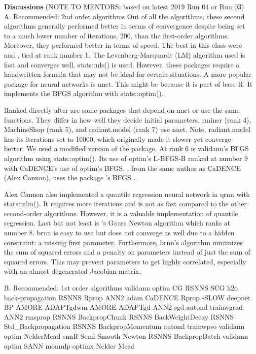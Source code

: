 \textbf{Discussions} (NOTE TO MENTORS: based on latest 2019 Run 04 or
Run 03) A. Recommended: 2nd order algorithms Out of all the algorithms,
these second algorithms generally performed better in terms of
convergence despite being set to a much lower number of iterations, 200,
than the first-order algorithms. Moreover, they performed better in
terms of speed. The best in this class were  and
, tied at rank number 1. The Levenberg-Marquardt (LM)
algorithm used is fast and converges well. stats::nls() is used.
However, these packages require a handwritten formula that may not be
ideal for certain situations. A more popular package for neural networks
is nnet. This might be because it is part of base R. It implements the
BFGS algorithm with stats::optim().

Ranked directly after are some packages that depend on nnet or use the
same functions. They differ in how well they decide initial parameters.
rminer (rank 4), MachineShop (rank 5), and radiant.model (rank 7) use
nnet. Note, radiant.model has its iterations set to 10000, which
originally made it slower yet converge better. We used a modified
version of the package. At rank 6 is validann's BFGS algorithm using
stats::optim(). Its use of optim's L-BFGS-B ranked at number 9 with
CaDENCE's use of optim's BFGS. , from the same author as
CaDENCE (Alex Cannon), uses the package 's BFGS
\citep{R-optimx}.

Alex Cannon also implemented a quantile regression neural network in
qrnn with stats::nlm(). It requires more iterations and is not as fast
compared to the other second-order algorithms. However, it is a valuable
implementation of quantile regression. Last but not least is
's Gauss Newton algorithm which ranks at number 8. brnn is
easy to use but does not converge as well due to a hidden constraint: a
missing first parameter. Furthermore, brnn's algorithm minimizes the sum
of squared errors and a penalty on parameters instead of just the sum of
squared errors. This may prevent parameters to get highly correlated,
especially with an almost degenerated Jacobian matrix.

B. Recommended: 1st order algorithms validann optim CG RSNNS SCG h2o
back-propagation RSNNS Rprop ANN2 adam CaDENCE Rprop -SLOW deepnet BP
AMORE ADAPTgdwm AMORE ADAPTgd ANN2 sgd automl trainwgrad ANN2 rmsprop
RSNNS BackpropChunk RSNNS BackWeightDecay RSNNS Std\_Backpropagation
RSNNS BackpropMomentum automl trainwpso validann optim NelderMead snnR
Semi Smooth Newton RSNNS BackpropBatch validann optim SANN monmlp optimx
Nelder Mead

